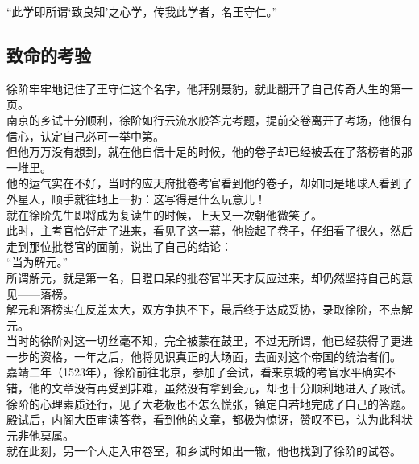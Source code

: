 \begin{multicols}{\theparacolNo}
“此学即所谓‘致良知’之心学，传我此学者，名王守仁。”\\

\subsection{致命的考验}
徐阶牢牢地记住了王守仁这个名字，他拜别聂豹，就此翻开了自己传奇人生的第一页。\\

南京的乡试十分顺利，徐阶如行云流水般答完考题，提前交卷离开了考场，他很有信心，认定自己必可一举中第。\\

但他万万没有想到，就在他自信十足的时候，他的卷子却已经被丢在了落榜者的那一堆里。\\

他的运气实在不好，当时的应天府批卷考官看到他的卷子，却如同是地球人看到了外星人，顺手就往地上一扔：这写得是什么玩意儿！\\

就在徐阶先生即将成为复读生的时候，上天又一次朝他微笑了。\\

此时，主考官恰好走了进来，看见了这一幕，他捡起了卷子，仔细看了很久，然后走到那位批卷官的面前，说出了自己的结论：\\

“当为解元。”\\

所谓解元，就是第一名，目瞪口呆的批卷官半天才反应过来，却仍然坚持自己的意见——落榜。\\

解元和落榜实在反差太大，双方争执不下，最后终于达成妥协，录取徐阶，不点解元。\\

当时的徐阶对这一切丝毫不知，完全被蒙在鼓里，不过无所谓，他已经获得了更进一步的资格，一年之后，他将见识真正的大场面，去面对这个帝国的统治者们。\\

嘉靖二年（1523年），徐阶前往北京，参加了会试，看来京城的考官水平确实不错，他的文章没有再受到非难，虽然没有拿到会元，却也十分顺利地进入了殿试。\\

徐阶的心理素质还行，见了大老板也不怎么慌张，镇定自若地完成了自己的答题。殿试后，内阁大臣审读答卷，看到他的文章，都极为惊讶，赞叹不已，认为此科状元非他莫属。\\

就在此刻，另一个人走入审卷室，和乡试时如出一辙，他也找到了徐阶的试卷。\\


\end{multicols}

